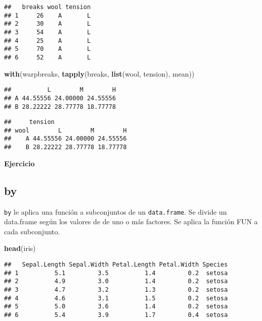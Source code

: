 \documentclass[]{article}
\newenvironment{Shaded}{\begin{snugshade}}{\end{snugshade}}
\newcommand{\KeywordTok}[1]{\textcolor[rgb]{0.13,0.29,0.53}{\textbf{{#1}}}}
\newcommand{\DataTypeTok}[1]{\textcolor[rgb]{0.13,0.29,0.53}{{#1}}}
\newcommand{\NormalTok}[1]{{#1}}
\begin{document}
\begin{verbatim}
##   breaks wool tension
## 1     26    A       L
## 2     30    A       L
## 3     54    A       L
## 4     25    A       L
## 5     70    A       L
## 6     52    A       L
\end{verbatim}

\begin{Shaded}
\begin{Highlighting}[]
\KeywordTok{with}\NormalTok{(warpbreaks, }\KeywordTok{tapply}\NormalTok{(breaks, }\KeywordTok{list}\NormalTok{(wool, tension), mean))}
\end{Highlighting}
\end{Shaded}

\begin{verbatim}
##          L        M        H
## A 44.55556 24.00000 24.55556
## B 28.22222 28.77778 18.77778
\end{verbatim}

\begin{Shaded}
\end{Shaded}

\begin{verbatim}
##     tension
## wool        L        M        H
##    A 44.55556 24.00000 24.55556
##    B 28.22222 28.77778 18.77778
\end{verbatim}

\textbf{Ejercicio}

\subsection{by}\label{by}

\texttt{by} le aplica una función a subconjuntos de un
\texttt{data.frame}. Se divide un data.frame según los valores de de uno
o más factores. Se aplica la función FUN a cada subconjunto.

\begin{Shaded}
\begin{Highlighting}[]
\KeywordTok{head}\NormalTok{(iris)}
\end{Highlighting}
\end{Shaded}

\begin{verbatim}
##   Sepal.Length Sepal.Width Petal.Length Petal.Width Species
## 1          5.1         3.5          1.4         0.2  setosa
## 2          4.9         3.0          1.4         0.2  setosa
## 3          4.7         3.2          1.3         0.2  setosa
## 4          4.6         3.1          1.5         0.2  setosa
## 5          5.0         3.6          1.4         0.2  setosa
## 6          5.4         3.9          1.7         0.4  setosa
\end{verbatim}
\end{document}
